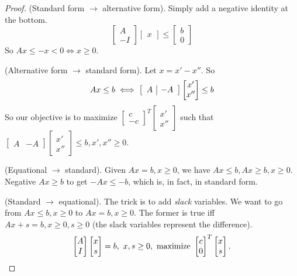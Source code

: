 \begin{proof}
    (Standard form $\to $ alternative form). Simply add a negative identity at the bottom. \[
    \begin{bmatrix}
        A \\ -I
    \end{bmatrix}
    \begin{bmatrix}
        x
    \end{bmatrix}\leq 
    \begin{bmatrix}
        b \\0
    \end{bmatrix}
    \] So $Ax \leq -x < 0 \iff x \geq 0$.

    (Alternative form $\to $ standard form). Let $x=x'-x''$. So \[
    Ax\leq b \iff 
    \left[\begin{array}{c | c} 
        A & -A 
    \end{array}\right]
    \begin{bmatrix}
        x' \\x''
    \end{bmatrix}\leq b
    \] So our objective is to maximize $
    \left[ 
    \begin{smallmatrix}
        c \\ -c
    \end{smallmatrix}\right] ^T \left[      \begin{smallmatrix}
       x' \\x'' 
    \end{smallmatrix}\right] $ such that $\left[ 
\begin{array}{c|c} 
    A & -A
\end{array}\right] \left[ 
\begin{smallmatrix}
    x'\\ x''
\end{smallmatrix}\right] \leq b, x',x'' \geq 0$. 

(Equational $\to $ standard). Given $Ax=b, x \geq 0$, we have $Ax \leq b, Ax \geq b, x \geq 0$. Negative $Ax \geq b$ to get $-Ax \leq -b$, which is, in fact, in standard form.

(Standard $\to $ equational). The trick is to add \emph{slack} variables. We want to go from $Ax \leq b, x \geq 0$ to $Ax=b,x \geq 0$. The former is true iff $Ax+s=b, x \geq 0, s \geq 0$ (the slack variables represent the difference). \[
\begin{bmatrix}
    A \\ I
\end{bmatrix}
\begin{bmatrix}
    x \\s
\end{bmatrix}=b, \ x,s \geq 0, \ \text{maximize} \ 
\begin{bmatrix}
    c \\ 0
\end{bmatrix}^T
\begin{bmatrix}
    x \\s
\end{bmatrix}.\qedhere
\] 
\end{proof}
